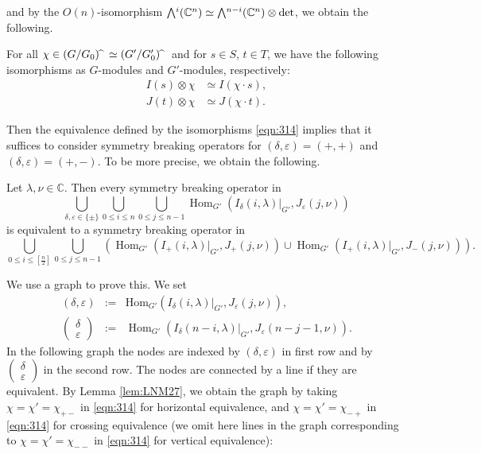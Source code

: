  and by the $O(n)$-isomorphism
 $\Exterior^i({\mathbb{C}}^n) \simeq \Exterior^{n-i}({\mathbb{C}}^n) \otimes \det$, 
 we obtain the following.  
\begin{lemma}
\label{lem:LNM27}
For all $\chi \in (G/G_0)\hspace{-1mm}{\widehat{\hphantom{m}}}\simeq (G'/G_0')\hspace{-1mm}{\widehat{\hphantom{m}}}$
 and for $s \in S$, $t \in T$, 
we have the following isomorphisms as $G$-modules
 and $G'$-modules, 
respectively:
\begin{align*}
   I(s) \otimes \chi &\simeq I(\chi \cdot s), 
\\
   J(t) \otimes \chi &\simeq J(\chi \cdot t).  
\end{align*}
\end{lemma}


Then the equivalence defined by the isomorphisms
 \eqref{eqn:314} implies
 that it suffices to consider symmetry breaking operators
 for $(\delta, \varepsilon) =(+,+)$
 and $(\delta, \varepsilon) =(+,-)$.
To be more precise,
 we obtain the following.  

\begin{proposition} 
Let $\lambda, \nu \in {\mathbb{C}}$.  
Then every symmetry breaking operator in 
\[
     \bigcup_{\delta,\varepsilon \in \{\pm\} }
     \bigcup_{0 \le i \le n} \bigcup_{0 \le j \le n-1}
     \operatorname{Hom}_{G'}(I_{\delta}(i,\lambda)|_{G'},J_{\varepsilon}(j,\nu))
\]
is equivalent to a symmetry breaking  operator in
\[ 
 \bigcup_{0 \le i \le [\frac n2]} \bigcup_{0 \le j \le n-1}
 \left(\operatorname{Hom}_{G'}(I_+(i,\lambda)|_{G'}, J_+(j,\nu)) 
 \cup
 \operatorname{Hom}_{G'}(I_+(i,\lambda)|_{G'}, J_-(j,\nu))
 \right).  
\]
\end{proposition}
\proof
We use a graph to prove this.
We set
\begin{eqnarray*} 
(\delta,\varepsilon) &:= & \mbox{Hom}_{G'}(I_{\delta} (i, \lambda)|_{G'}, J_{\varepsilon}(j,\nu)), 
\\
\begin{pmatrix} \delta \\ \varepsilon \end{pmatrix} 
&:=& \operatorname{Hom}_{G'}(I_{\delta} (n-i, \lambda)|_{G'}, J_{\varepsilon}(n-j-1,\nu)).  
\end{eqnarray*}
In the following graph the nodes are indexed by $(\delta,\varepsilon)$
 in first row and by
 $\begin{pmatrix} \delta \\ \varepsilon \end{pmatrix}$
 in the second row.  
The nodes are connected by a line if they are equivalent.  
By Lemma \ref{lem:LNM27}, 
 we obtain the graph by taking 
$\chi=\chi'=\chi_{+-}$
 in \eqref{eqn:314}
 for horizontal equivalence,
 and 
$\chi=\chi'=\chi_{-+}$ in \eqref{eqn:314}
 for crossing equivalence
 (we omit here lines in the graph
 corresponding to 
 $\chi=\chi'=\chi_{--}$ in \eqref{eqn:314}
 for vertical equivalence):

